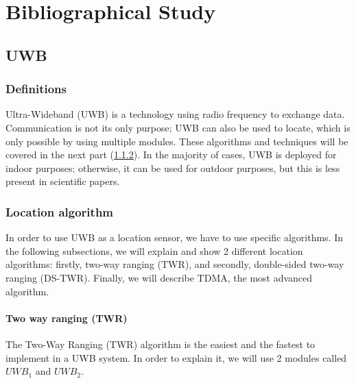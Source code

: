 \chapter{Bibliographical Study}
\label{Bibliographical Study}

\section{UWB}

\subsection{Definitions} 
Ultra-Wideband (UWB) is a technology using radio frequency to exchange data.
Communication is not its only purpose; UWB can also be used to locate, which is only possible by using multiple modules. These algorithms and techniques will be covered in the next part (\ref{UWB_Algo_localisation}).
In the majority of cases, UWB is deployed for indoor purposes; otherwise, it can be used for outdoor purposes, but this is less present in scientific papers.


\subsection{Location algorithm}\label{UWB_Algo_localisation}
In order to use UWB as a location sensor, we have to use specific algorithms. In the following subsections, we will explain and show 2 different location algorithms: firstly, two-way ranging (TWR), and secondly, double-sided two-way ranging (DS-TWR). Finally, we will describe TDMA, the most advanced algorithm.

\subsubsection{Two way ranging (TWR)}
The Two-Way Ranging (TWR) algorithm is the easiest and the fastest to implement in a UWB system.
In order to explain it, we will use 2 modules called $UWB_1$ and $UWB_2$.

